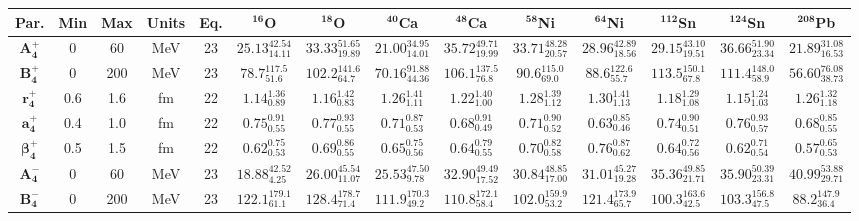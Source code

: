 \bgroup
\def\arraystretch{1.5}%
\begin{tabular}{ c c c c c c c c c c c c c c} 
\textbf{Par.} & \textbf{Min} & \textbf{Max} &                \textbf{Units} & \textbf{Eq.}& \textbf{$\mathbf{^{16}}$O}& \textbf{$\mathbf{^{18}}$O}& \textbf{$\mathbf{^{40}}$Ca}& \textbf{$\mathbf{^{48}}$Ca}& \textbf{$\mathbf{^{58}}$Ni}& \textbf{$\mathbf{^{64}}$Ni}& \textbf{$\mathbf{^{112}}$Sn}& \textbf{$\mathbf{^{124}}$Sn}& \textbf{$\mathbf{^{208}}$Pb}\\
 \hline 
$\mathbf{A_{4}^{+}}$ & 0 & 60 & MeV & 23 & $25.13^{42.54}_{14.11}$ & $33.33^{51.65}_{19.89}$ & $21.00^{34.95}_{14.01}$ & $35.72^{49.71}_{19.99}$ & $33.71^{48.28}_{20.57}$ & $28.96^{42.89}_{18.56}$ & $29.15^{43.10}_{19.51}$ & $36.66^{51.90}_{23.34}$ & $21.89^{31.08}_{16.53}$\\ 
$\mathbf{B_{4}^{+}}$ & 0 & 200 & MeV & 23 & $78.7^{117.5}_{51.6}$ & $102.2^{141.6}_{64.7}$ & $70.16^{91.88}_{44.36}$ & $106.1^{137.5}_{76.8}$ & $90.6^{115.0}_{69.0}$ & $88.6^{122.6}_{55.7}$ & $113.5^{150.1}_{67.8}$ & $111.4^{148.0}_{58.9}$ & $56.60^{76.08}_{38.73}$\\ 
$\mathbf{r_{4}^{+}}$ & 0.6 & 1.6 & fm & 22 & $1.14^{1.36}_{0.89}$ & $1.16^{1.42}_{0.83}$ & $1.26^{1.41}_{1.11}$ & $1.22^{1.40}_{1.00}$ & $1.28^{1.39}_{1.12}$ & $1.30^{1.41}_{1.13}$ & $1.18^{1.29}_{1.08}$ & $1.15^{1.24}_{1.03}$ & $1.26^{1.32}_{1.18}$\\ 
$\mathbf{a_{4}^{+}}$ & 0.4 & 1.0 & fm & 22 & $0.75^{0.91}_{0.55}$ & $0.77^{0.93}_{0.55}$ & $0.71^{0.87}_{0.53}$ & $0.68^{0.91}_{0.49}$ & $0.71^{0.90}_{0.52}$ & $0.63^{0.85}_{0.46}$ & $0.74^{0.90}_{0.51}$ & $0.76^{0.93}_{0.57}$ & $0.68^{0.85}_{0.55}$\\ 
$\mathbf{\beta_{4}^{+}}$ & 0.5 & 1.5 & fm & 22 & $0.62^{0.75}_{0.53}$ & $0.69^{0.86}_{0.55}$ & $0.65^{0.75}_{0.56}$ & $0.64^{0.79}_{0.55}$ & $0.70^{0.82}_{0.58}$ & $0.76^{0.87}_{0.62}$ & $0.64^{0.72}_{0.56}$ & $0.62^{0.71}_{0.54}$ & $0.57^{0.65}_{0.53}$\\ 
$\mathbf{A_{4}^{-}}$ & 0 & 60 & MeV & 23 & $18.88^{42.52}_{4.25}$ & $26.00^{45.54}_{11.07}$ & $25.53^{47.50}_{9.78}$ & $32.90^{49.49}_{17.52}$ & $30.84^{48.85}_{17.00}$ & $31.01^{45.27}_{19.28}$ & $35.36^{49.85}_{21.71}$ & $35.90^{50.39}_{23.31}$ & $40.99^{53.88}_{29.71}$\\ 
$\mathbf{B_{4}^{-}}$ & 0 & 200 & MeV & 23 & $122.1^{179.1}_{61.1}$ & $128.4^{178.7}_{71.4}$ & $111.9^{170.3}_{49.2}$ & $110.8^{172.1}_{58.4}$ & $102.0^{159.9}_{53.2}$ & $121.4^{173.9}_{65.7}$ & $100.3^{163.6}_{42.5}$ & $103.3^{156.8}_{47.5}$ & $88.2^{147.9}_{36.4}$\\ 

\end{tabular}
